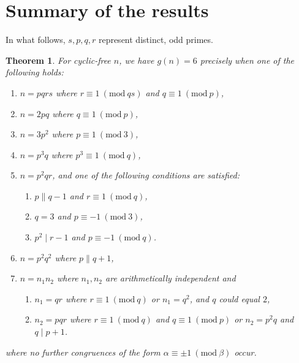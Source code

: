 \documentclass{article}
\newcommand{\Mod}[1]{\ (\mathrm{mod} \ #1)}
\theoremstyle{plain}
\newtheorem{thm}{Theorem}[section]
\theoremstyle{definition}
\begin{document}
\section{Summary of the results}
In what follows, $s, p, q, r$ represent distinct, odd primes.
\nopagebreak
{}
\begin{thm}
	For cyclic-free $n$, we have $g(n) = 6$ precisely when one of the following holds:
	\begin{enumerate} \listspace
		\item $n = pqrs$ where $r \equiv 1 \Mod{qs}$ and $q \equiv 1 \Mod{p}$,
		\item $n = 2pq$ where $q \equiv 1 \Mod{p}$,
		\item $n = 3p^2$ where $p \equiv 1 \Mod{3}$,
		\item $n = p^3 q$ where $p^3 \equiv 1 \Mod{q}$,
		\item $n = p^2 q r$, and one of the following conditions are satisfied:
		\begin{enumerate}
			\item $p \parallel q - 1$ and $r \equiv 1 \Mod{q}$,
			\item $q = 3$ and $p \equiv -1 \Mod{3}$,
			\item $p^2 \mid r - 1$ and $p \equiv -1 \Mod{q}$.
		\end{enumerate}
		\item $n = p^2 q^2$ where $p \parallel q + 1$,
		\item $n = n_1 n_2$ where $n_1, n_2$ are arithmetically independent and
		\begin{enumerate}
			\item $n_1 = qr$ where $r \equiv 1 \Mod{q}$ or $n_1 = q^2$, and $q$ could equal $2$,
			\item $n_2 = pqr$ where $r \equiv 1 \Mod{q}$ and $q \equiv 1 \Mod{p}$ or $n_2 = p^2 q$ and $q \mid p + 1$.
		\end{enumerate}
	\end{enumerate} \textspace
	where no further congruences of the form $\alpha \equiv \pm 1 \Mod{\beta}$ \nolinebreak[4] \mbox{occur}.
\end{thm}
\end{document}

